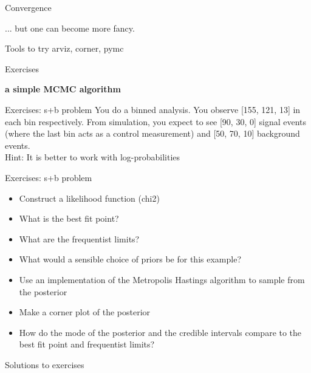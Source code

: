 \documentclass[
aspectratio=169,
14pt,
professionalfonts
]{beamer}
\begin{document}
\begin{frame}{Convergence}
\begin{minipage}[t]{0.49\linewidth}
\begin{figure}
    \end{figure}
    \end{minipage}
    ... but one can become more fancy. %
\end{frame}

\begin{frame}{Tools to try}
arviz, corner, pymc
\end{frame}

\begin{frame}{Exercises}

\textbf{a simple MCMC algorithm}\\

\end{frame}

\begin{frame}{Exercises: s+b problem}
\small
You do a binned analysis. You observe [155, 121,  13] in each bin respectively. From simulation, you expect to see [90, 30, 0] signal events (where the last bin acts as a control measurement) and [50, 70, 10] background events.\\
Hint: It is better to work with log-probabilities
    
\end{frame}

\begin{frame}{Exercises: s+b problem}
\small
\begin{itemize}
    \item Construct a likelihood function (chi2)
    \item What is the best fit point?
    \item What are the frequentist limits?
    \item What would a sensible choice of priors be for this example?
    \item Use an implementation of the Metropolis Hastings algorithm to sample from the posterior
    \item Make a corner plot of the posterior
    \item How do the mode of the posterior and the credible intervals compare to the best fit point and frequentist limits?
\end{itemize}
    
\end{frame}

\appendix

\begin{frame}
    \center
    \Large
    Solutions to exercises
\end{frame}
\end{document}
